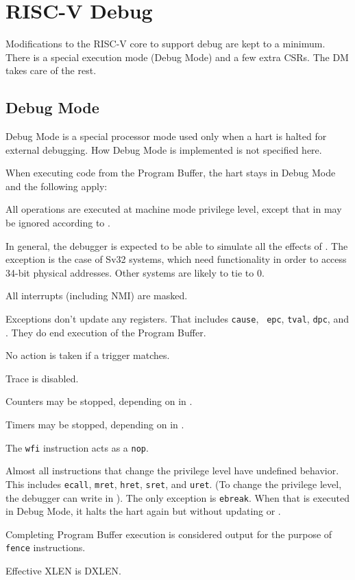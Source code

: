 \chapter{RISC-V Debug}
\label{sec:core_debug}

Modifications to the RISC-V core to support debug are kept to a minimum.  There
is a special execution mode (Debug Mode) and a few extra CSRs. The DM takes care
of the rest.

\section{Debug Mode} \label{debugmode}

Debug Mode is a special processor mode used only when a hart is halted for
external debugging. How Debug Mode is implemented is not specified here.

\begin{steps}{When executing code from the Program Buffer, the hart stays
    in Debug Mode and the following apply:}
\item All operations are executed at machine mode privilege level, except that
    \Fmprv in \Rmstatus may be ignored according to \Fmprven.
    \begin{commentary}
      In general, the debugger is expected to be able to simulate all the effects of \Fmprv.
      The exception is the case of Sv32 systems, which need \Fmprv functionality in order to access
      34-bit physical addresses. Other systems are likely to tie \Fmprven to 0.
    \end{commentary}
\item All interrupts (including NMI) are masked.
\item Exceptions don't update any registers.  That includes {\tt cause}, {\tt
    epc}, {\tt tval}, {\tt dpc}, and \Rmstatus. They do end execution of the
    Program Buffer.
\item No action is taken if a trigger matches.
\item Trace is disabled.
\item Counters may be stopped, depending on \Fstopcount in \Rdcsr.
\item Timers may be stopped, depending on \Fstoptime in \Rdcsr.
\item The {\tt wfi} instruction acts as a {\tt nop}.
\item Almost all instructions that change the privilege level have undefined
    behavior.  This includes {\tt ecall}, {\tt mret}, {\tt hret}, {\tt sret},
    and {\tt uret}.  (To change the privilege level, the debugger can write
    \Fprv in \Rdcsr). The only exception is {\tt ebreak}. When that is executed
    in Debug Mode, it halts the hart again but without updating \Rdpc or \Rdcsr.
\item \label{fence} Completing Program Buffer execution is considered output for the purpose
    of {\tt fence} instructions.
\item Effective XLEN is DXLEN.
\end{steps}

